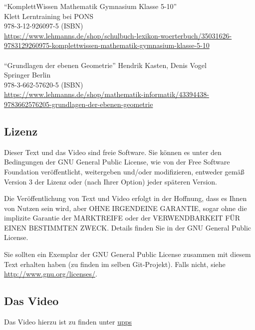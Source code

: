 \documentclass[a4paper]{amsart}
\theoremstyle{definition}
\begin{document}
"`KomplettWissen Mathematik Gymnasium Klasse 5-10"'\\
Klett Lerntraining bei PONS\\
978-3-12-926097-5 (ISBN)\\
{\tiny
   \url{https://www.lehmanns.de/shop/schulbuch-lexikon-woerterbuch/35031626-9783129260975-komplettwissen-mathematik-gymnasium-klasse-5-10
   }
}\\
\\
"`Grundlagen der ebenen Geometrie"'
Hendrik Kasten, Denis Vogel\\
Springer Berlin\\
978-3-662-57620-5 (ISBN)\\
{\tiny
   \url{
      https://www.lehmanns.de/shop/mathematik-informatik/43394438-9783662576205-grundlagen-der-ebenen-geometrie
   }
}

\subsection*{Lizenz}
Dieser Text und das Video sind freie Software. Sie können es unter den Bedingungen der 
GNU General Public License, wie von der Free Software Foundation veröffentlicht, weitergeben 
und/oder modifizieren, entweder gemäß Version 3 der Lizenz oder (nach Ihrer Option) jeder späteren Version.

Die Veröffentlichung von Text und Video erfolgt in der Hoffnung, dass es Ihnen von Nutzen sein wird, 
aber OHNE IRGENDEINE GARANTIE, sogar ohne die implizite Garantie der MARKTREIFE oder der 
VERWENDBARKEIT FÜR EINEN BESTIMMTEN ZWECK. Details finden Sie in der GNU General Public License.

Sie sollten ein Exemplar der GNU General Public License zusammen mit diesem Text erhalten haben 
(zu finden im selben Git-Projekt). 
Falls nicht, siehe \url{http://www.gnu.org/licenses/}.

\subsection*{Das Video}
Das Video hierzu ist zu finden unter 
{\tiny
   \url{upps}
}

\end{document}
